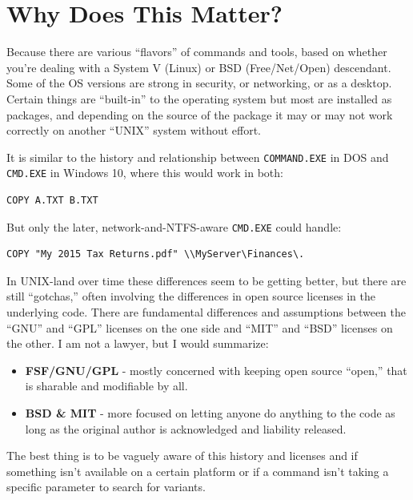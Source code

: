 \documentclass[10pt,]{book}
\numberwithin{figure}{chapter}
\DeclareRobustCommand{\drshl}[1]{\index{Shells!#1}}
\begin{document}
\section{Why Does This Matter?}\label{why-does-this-matter}

Because there are various ``flavors'' of commands and tools, based on
whether you're dealing with a System V (Linux) or BSD (Free/Net/Open)
descendant. Some of the OS versions are strong in security, or
networking, or as a desktop. Certain things are ``built-in'' to the
operating system but most are installed as packages, and depending on
the source of the package it may or may not work correctly on another
``UNIX'' system without effort.

It is similar to the history and relationship between
\texttt{COMMAND.EXE}\drshl{COMMAND.EXE} in DOS and
\texttt{CMD.EXE}\drshl{CMD.EXE} in Windows 10, where this would work in
both:

\begin{verbatim}
COPY A.TXT B.TXT
\end{verbatim}

But only the later, network-and-NTFS-aware \texttt{CMD.EXE} could
handle:

\begin{verbatim}
COPY "My 2015 Tax Returns.pdf" \\MyServer\Finances\.
\end{verbatim}

In UNIX-land over time these differences seem to be getting better, but
there are still ``gotchas,'' often involving the differences in open
source licenses in the underlying code. There are fundamental
differences and assumptions between the ``GNU'' and ``GPL'' licenses on
the one side and ``MIT'' and ``BSD'' licenses on the other. I am not a
lawyer, but I would summarize:

\begin{itemize}
\item
  \textbf{FSF/GNU/GPL} - mostly concerned with keeping open source
  ``open,'' that is sharable and modifiable by all.
\item
  \textbf{BSD \& MIT} - more focused on letting anyone do anything to
  the code as long as the original author is acknowledged and liability
  released.
\end{itemize}

The best thing is to be vaguely aware of this history and licenses and
if something isn't available on a certain platform or if a command isn't
taking a specific parameter to search for variants.
\end{document}
